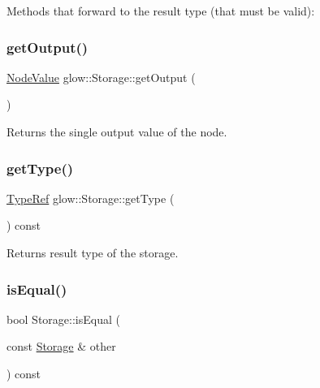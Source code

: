 Methods that forward to the result type (that must be valid)\+: \mbox{\label{classglow_1_1_storage_a76b8f66f05094e222fc5416688fd9014}} 
\subsubsection{\texorpdfstring{get\+Output()}{getOutput()}}
{\footnotesize\ttfamily \hyperlink{structglow_1_1_node_value}{Node\+Value} glow\+::\+Storage\+::get\+Output (\begin{DoxyParamCaption}{ }\end{DoxyParamCaption})\hspace{0.3cm}{\ttfamily [inline]}}

\begin{DoxyReturn}{Returns}
the single output value of the node. 
\end{DoxyReturn}
\mbox{\label{classglow_1_1_storage_a7dd9963b09942c7e1772125112be7e3f}} 
\subsubsection{\texorpdfstring{get\+Type()}{getType()}}
{\footnotesize\ttfamily \hyperlink{structglow_1_1_type}{Type\+Ref} glow\+::\+Storage\+::get\+Type (\begin{DoxyParamCaption}{ }\end{DoxyParamCaption}) const\hspace{0.3cm}{\ttfamily [inline]}}

\begin{DoxyReturn}{Returns}
result type of the storage. 
\end{DoxyReturn}
\mbox{\label{classglow_1_1_storage_a549ea8dc4f7cfe34182eda64649458d9}} 
\subsubsection{\texorpdfstring{is\+Equal()}{isEqual()}}
{\footnotesize\ttfamily bool Storage\+::is\+Equal (\begin{DoxyParamCaption}\item[{const \hyperlink{classglow_1_1_storage}{Storage} \&}]{other }\end{DoxyParamCaption}) const}

